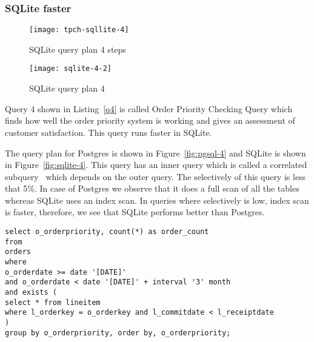\subsubsection{SQLite faster}


\begin{figure*}[ht]
\centering
     \begin{subfigure}[b]{0.4\textwidth}
         \centering
         \texttt{[image: tpch-sqllite-4]}
         \caption{SQLite query plan 4 steps}
         \label{fig:tpch-sqllite-4}
     \end{subfigure}
     \hfill
     \begin{subfigure}[b]{0.4\textwidth}
         \centering
         \texttt{[image: sqlite-4-2]}
         \caption{SQLite query plan 4}
         \label{fig:sqlite-4-2}
     \end{subfigure}

        \caption{SQLite plan for query 4}
        \label{fig:sqlite-4}
\end{figure*}
Query 4 shown in Listing~\ref{q4} is called Order Priority Checking Query which finds how well the order priority system is working and gives an assessment of customer satisfaction. This query runs faster in SQLite.

The query plan for Postgres is shown in Figure~\ref{fig:pgsql-4} and SQLite is shown in Figure~\ref{fig:sqlite-4}. This query has an inner query which is called a correlated subquery~\cite{ref:sqlite1} which depends on the outer query. The selectively of this query is less that 5\%. In case of Postgres we observe  that it does a full scan of all the tables whereas SQLite uses an index scan. In queries where selectively is low, index scan is faster, therefore, we see that SQLite performs better than Postgres.

\begin{minipage}{\linewidth}
\begin{lstlisting}[breaklines=true, numbers=none, label=q4, caption=Query 4]
select o_orderpriority, count(*) as order_count
from
orders
where
o_orderdate >= date '[DATE]'
and o_orderdate < date '[DATE]' + interval '3' month
and exists (
select * from lineitem
where l_orderkey = o_orderkey and l_commitdate < l_receiptdate
)
group by o_orderpriority, order by, o_orderpriority;
\end{lstlisting}
\end{minipage}






